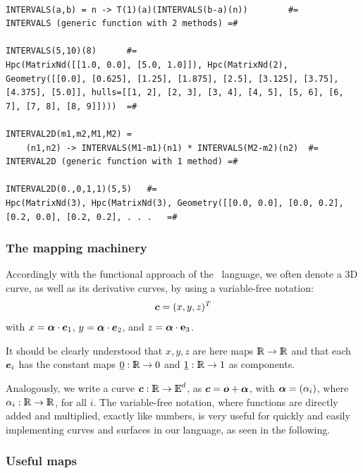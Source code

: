 \begin{coding}[Algebraic computation of FE = $\delta_1$]
\begin{coding}[Toolbox]\
\begin{lstlisting}[language=JuliaLocal, style=julia, mathescape=true]
INTERVALS(a,b) = n -> T(1)(a)(INTERVALS(b-a)(n))		#=
INTERVALS (generic function with 2 methods)	=#

INTERVALS(5,10)(8)		#=
Hpc(MatrixNd([[1.0, 0.0], [5.0, 1.0]]), Hpc(MatrixNd(2), Geometry([[0.0], [0.625], [1.25], [1.875], [2.5], [3.125], [3.75], [4.375], [5.0]], hulls=[[1, 2], [2, 3], [3, 4], [4, 5], [5, 6], [6, 7], [7, 8], [8, 9]])))	=#

INTERVAL2D(m1,m2,M1,M2) = 
	(n1,n2) -> INTERVALS(M1-m1)(n1) * INTERVALS(M2-m2)(n2)	#=
INTERVAL2D (generic function with 1 method)	=#

INTERVAL2D(0.,0,1,1)(5,5)	#=
Hpc(MatrixNd(3), Hpc(MatrixNd(3), Geometry([[0.0, 0.0], [0.0, 0.2], [0.2, 0.0], [0.2, 0.2], . . . 	=#
\end{lstlisting}
\label{script:5:toolbox}
\end{coding}\vspace{3mm}



\subsubsection*{ The mapping machinery}\label{sect:5-3-2}
\label{sec:5:free}

Accordingly with the functional approach of the \pl\ language, we
often denote a 3D curve, as well as its derivative curves, by using
a variable-free notation:
\[
{\mbox{\boldmath $c$}} = (x,  y, z)^T
\]
with ${x} = {\mbox{\boldmath $\alpha$}} \cdot {\mbox{\boldmath $e$}}_{1}$, ${y} = {\mbox{\boldmath $\alpha$}} \cdot
{\mbox{\boldmath $e$}}_{2}$, and ${z} = {\mbox{\boldmath $\alpha$}} \cdot \mathbf{e}_{3}$.%

It should be clearly understood that $x, y, z$ %
are here maps $\mathbb{I\!\!R}\rightarrow\mathbb{I\!\!R}$ and that each ${\mbox{\boldmath $e$}}_{i}$ has the
constant maps $\underline{0}:\mathbb{I\!\!R}\rightarrow 0$ and
$\underline{1}:\mathbb{I\!\!R}\rightarrow 1$ as components.

Analogously, we write a curve ${\mbox{\boldmath $c$}}:\mathbb{I\!\!R}\rightarrow \mathbb{I\!\!E}^{d}$, as
${\mbox{\boldmath $c$}}={\mbox{\boldmath $o$}}+{\mbox{\boldmath $\alpha$}}$, with ${\mbox{\boldmath $\alpha$}}=(\alpha_{i})$, where
$\alpha_{i}: \mathbb{I\!\!R}\rightarrow\mathbb{I\!\!R}$, for all $i$.  The variable-free
notation, where functions are directly added and multiplied, exactly
like numbers, is very useful for quickly and easily implementing
curves and surfaces in our language, as seen in the following.

\subsubsection*{Useful maps}


\end{coding}

